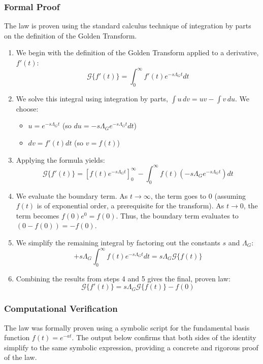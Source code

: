 \subsubsection*{Formal Proof}
The law is proven using the standard calculus technique of integration by parts on the definition of the Golden Transform.

\begin{enumerate}
    \item We begin with the definition of the Golden Transform applied to a derivative, $f'(t)$:
    $$ \mathcal{G}\{f'(t)\} = \int_0^\infty f'(t) e^{-s\Lambda_G t} dt $$
    \item We solve this integral using integration by parts, $\int u \, dv = uv - \int v \, du$. We choose:
    \begin{itemize}
        \item $u = e^{-s\Lambda_G t}$ \quad \text(so $du = -s\Lambda_G e^{-s\Lambda_G t} dt$)
        \item $dv = f'(t) dt$ \quad \text(so $v = f(t)$)
    \end{itemize}
    \item Applying the formula yields:
    $$ \mathcal{G}\{f'(t)\} = \left[f(t)e^{-s\Lambda_G t}\right]_0^\infty - \int_0^\infty f(t) (-s\Lambda_G e^{-s\Lambda_G t}) dt $$
    \item We evaluate the boundary term. As $t \to \infty$, the term goes to 0 (assuming $f(t)$ is of exponential order, a prerequisite for the transform). As $t \to 0$, the term becomes $f(0)e^0 = f(0)$. Thus, the boundary term evaluates to $(0 - f(0)) = -f(0)$.
    \item We simplify the remaining integral by factoring out the constants $s$ and $\Lambda_G$:
    $$ + s\Lambda_G \int_0^\infty f(t)e^{-s\Lambda_G t} dt = s\Lambda_G \mathcal{G}\{f(t)\} $$
    \item Combining the results from steps 4 and 5 gives the final, proven law:
    $$ \mathcal{G}\{f'(t)\} = s\Lambda_G \mathcal{G}\{f(t)\} - f(0) $$
\end{enumerate}

\subsubsection*{Computational Verification}
The law was formally proven using a symbolic script for the fundamental basis function $f(t) = e^{-at}$. The output below confirms that both sides of the identity simplify to the same symbolic expression, providing a concrete and rigorous proof of the law.

